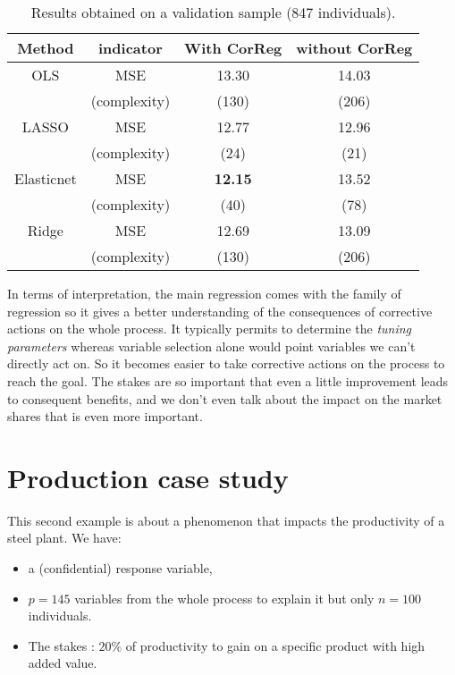 \documentclass[12pt,a4paper]{report}
\begin{document}
		\begin{table}[h!]
\centering
\begin{tabular}{|c c|c|c|}
	\hline 
	Method& indicator& With CorReg & without CorReg \\ 
	\hline 
	OLS & MSE & 13.30 & 14.03 \\
		& (complexity)& (130) & (206) \\
	\hline
	LASSO & MSE & 12.77 & 12.96 \\
		& (complexity)& (24) & (21) \\
	\hline
	Elasticnet & MSE & \textbf{12.15} & 13.52 \\
		& (complexity)& (40) & (78) \\
	\hline
	Ridge & MSE & 12.69 & 13.09 \\
		& (complexity)& (130) & (206) \\
	\hline
\end{tabular} 
\caption{Results obtained on a validation sample (847 individuals).}\label{Res_exfos}
\end{table}


		In terms of interpretation, the main regression comes with the family of regression so it gives a better understanding of the consequences of corrective actions on the whole process. It typically permits to determine the \textit{tuning parameters} whereas variable selection alone would point variables we can't directly act on.	So it becomes easier to take corrective actions on the process to reach the goal. The stakes are so important that even a little improvement leads to consequent benefits, and we don't even talk about the impact on the market shares that is even more important.
		\FloatBarrier
		\section{Production case study}
This second example is about a phenomenon that impacts the productivity of a steel plant.
We have:
		\begin{itemize}
			\item a (confidential)  response variable,
			\item $p=145$ variables from the whole process to explain it but only $n=100$ individuals.
			\item The stakes : $20\%$ of productivity to gain on a specific product with high added value.
		\end{itemize}
		
\end{document}

